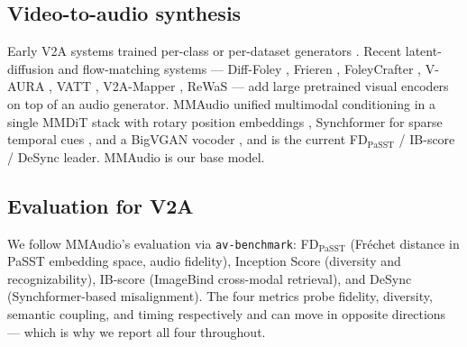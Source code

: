 \subsection{Video-to-audio synthesis}
Early V2A systems trained per-class or per-dataset generators
\citep{owens2016visually,owens2018audio}. Recent latent-diffusion
and flow-matching systems --- Diff-Foley
\citep{luo2024difffoley}, Frieren \citep{wang2024frieren},
FoleyCrafter \citep{zhang2024foleycrafter}, V-AURA
\citep{viertola2024vaura}, VATT \citep{liu2024vatt}, V2A-Mapper
\citep{wang2024v2amapper}, ReWaS \citep{jeong2024rewas} --- add
large pretrained visual encoders on top of an audio generator.
MMAudio \citep{cheng2024mmaudio} unified multimodal conditioning
in a single MMDiT stack \citep{esser2024scaling} with rotary
position embeddings \citep{su2024roformer}, Synchformer for
sparse temporal cues \citep{iashin2024synchformer}, and a BigVGAN
vocoder \citep{lee2023bigvgan}, and is the current
FD$_{\text{PaSST}}$ / IB-score / DeSync leader. MMAudio is our
base model.

\subsection{Evaluation for V2A}
We follow MMAudio's evaluation via \texttt{av-benchmark}:
FD$_{\text{PaSST}}$ (Fr\'echet distance in PaSST embedding space,
audio fidelity), Inception Score (diversity and
recognizability), IB-score (ImageBind
\citep{girdhar2023imagebind} cross-modal retrieval), and DeSync
(Synchformer-based misalignment). The four metrics probe
fidelity, diversity, semantic coupling, and timing respectively
and can move in opposite directions --- which is why we report
all four throughout.
